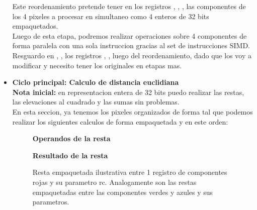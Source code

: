 \begin{itemize}
           Este reordenamiento pretende tener en los registros , , , las componentes de los 4 pixeles a procesar en simultaneo como 4 enteros de 32 bits empaquetados.\\
      Luego de esta etapa, podremos realizar operaciones sobre 4 componentes de forma paralela con una sola instruccion gracias al set de instrucciones SIMD. Resguardo en , ,  los registros , ,  luego del reordenamiento, dado que los voy a modificar y necesito tener los originales en etapas mas.\\
  \item \textbf{Ciclo principal: Calculo de distancia euclidiana}\\
      \textbf{Nota inicial:} en representacion entera de 32 bits puedo realizar las restas, las elevaciones al cuadrado y las sumas sin problemas.\\
      En esta seccion, ya tenemos los pixeles organizados de forma tal que podemos realizar los siguientes calculos de forma empaquetada y en este orden:
        \begin{figure}[!ht]
              \centering
              \par      
              \bigskip
              \textbf{Operandos de la resta}
              \par      
              \bigskip
            \par      
            \bigskip
            \textbf{Resultado de la resta}
            \par      
            \bigskip
            \caption{Resta empaquetada ilustrativa entre 1 registro de componentes rojas y su parametro rc. Analogamente son las restas empaquetadas entre las componentes verdes y azules y sus parametros.}          
        \end{figure}
        

\end{itemize}
